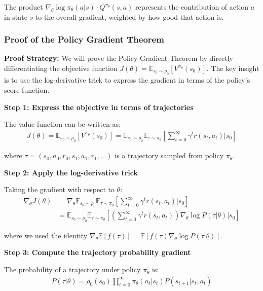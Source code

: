 The product $\nabla_\theta \log \pi_\theta(a|s) \cdot Q^{\pi_\theta}(s,a)$ represents the contribution of action $a$ in state $s$ to the overall gradient, weighted by how good that action is.

\subsubsection{Proof of the Policy Gradient Theorem}

\textbf{Proof Strategy:}
We will prove the Policy Gradient Theorem by directly differentiating the objective function $J(\theta) = \mathbb{E}_{s_0 \sim \rho_0} [V^{\pi_\theta}(s_0)]$. The key insight is to use the log-derivative trick to express the gradient in terms of the policy's score function.

\textbf{Step 1: Express the objective in terms of trajectories}

The value function can be written as:
\begin{align}
J(\theta) = \mathbb{E}_{s_0 \sim \rho_0} [V^{\pi_\theta}(s_0)] = \mathbb{E}_{s_0 \sim \rho_0} \mathbb{E}_{\tau \sim \pi_\theta} \left[ \sum_{t=0}^{\infty} \gamma^t r(s_t, a_t) \Big| s_0 \right]
\end{align}

where $\tau = (s_0, a_0, r_0, s_1, a_1, r_1, \ldots)$ is a trajectory sampled from policy $\pi_\theta$.

\textbf{Step 2: Apply the log-derivative trick}

Taking the gradient with respect to $\theta$:
\begin{align}
\nabla_\theta J(\theta) &= \nabla_\theta \mathbb{E}_{s_0 \sim \rho_0} \mathbb{E}_{\tau \sim \pi_\theta} \left[ \sum_{t=0}^{\infty} \gamma^t r(s_t, a_t) \Big| s_0 \right] \\
&= \mathbb{E}_{s_0 \sim \rho_0} \mathbb{E}_{\tau \sim \pi_\theta} \left[ \left( \sum_{t=0}^{\infty} \gamma^t r(s_t, a_t) \right) \nabla_\theta \log P(\tau|\theta) \Big| s_0 \right]
\end{align}

where we used the identity $\nabla_\theta \mathbb{E}[f(\tau)] = \mathbb{E}[f(\tau) \nabla_\theta \log P(\tau|\theta)]$.

\textbf{Step 3: Compute the trajectory probability gradient}

The probability of a trajectory under policy $\pi_\theta$ is:
\begin{align}
P(\tau|\theta) = \rho_0(s_0) \prod_{t=0}^{\infty} \pi_\theta(a_t|s_t) P(s_{t+1}|s_t, a_t)
\end{align}

